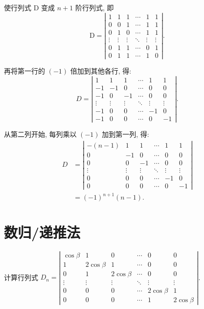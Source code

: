 \begin{solution}
    使行列式 D 变成 $n+1$ 阶行列式, 即
$$
\mathrm{D}=\left|\begin{array}{cccccc}
1 & 1 & 1 & \cdots & 1 & 1 \\
0 & 0 & 1 & \cdots & 1 & 1 \\
0 & 1 & 0 & \cdots & 1 & 1 \\
\vdots & \vdots & \vdots & \ddots & \vdots & \vdots \\
0 & 1 & 1 & \cdots & 0 & 1 \\
0 & 1 & 1 & \cdots & 1 & 0
\end{array}\right| .
$$

再将第一行的 $(-1)$ 倍加到其他各行, 得:
$$
D=\left|\begin{array}{cccccc}
1 & 1 & 1 & \cdots & 1 & 1 \\
-1 & -1 & 0 & \cdots & 0 & 0 \\
-1 & 0 & -1 & \cdots & 0 & 0 \\
\vdots & \vdots & \vdots & \ddots & \vdots & \vdots \\
-1 & 0 & 0 & \cdots & -1 & 0 \\
-1 & 0 & 0 & \cdots & 0 & -1
\end{array}\right| .
$$

从第二列开始, 每列乘以 $(-1)$ 加到第一列, 得:
$$
\begin{aligned}
D &=\left|\begin{array}{cccccc}
-(n-1) & 1 & 1 & \cdots & 1 & 1 \\
0 & -1 & 0 & \cdots & 0 & 0 \\
0 & 0 & -1 & \cdots & 0 & 0 \\
\vdots & \vdots & \vdots & \ddots & \vdots & \vdots \\
0 & 0 & 0 & \cdots & -1 & 0 \\
0 & 0 & 0 & \cdots & 0 & -1
\end{array}\right| \\
&=(-1)^{n+1}(n-1) .
\end{aligned}
$$
\end{solution}


\section{数归/递推法}

\begin{example}
    计算行列式 
$D_{n}=\left|\begin{array}{cccccc}
\cos \beta & 1 & 0 & \cdots & 0 & 0 \\
1 & 2 \cos \beta & 1 & \cdots & 0 & 0 \\
0 & 1 & 2 \cos \beta & \cdots & 0 & 0 \\
\vdots & \vdots & \vdots & \ddots & \vdots & \vdots \\
0 & 0 & 0 & \cdots & 2 \cos \beta & 1 \\
0 & 0 & 0 & \cdots & 1 & 2 \cos \beta
\end{array}\right|$.
\end{example}

